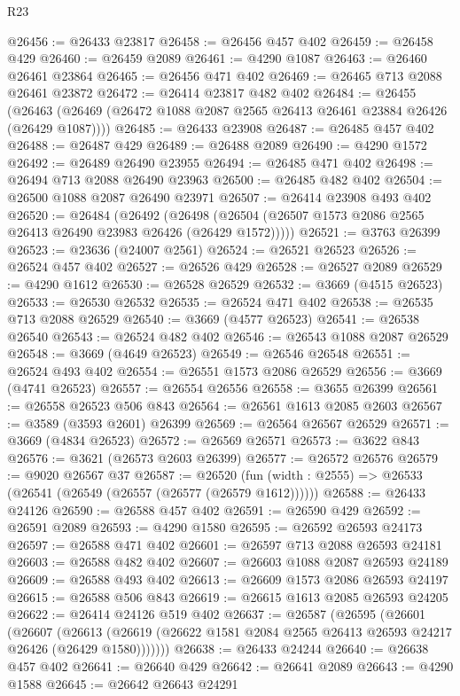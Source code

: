 \begin{lexlean}{R23}
\begin{coremodule}
@26456 := @26433 @23817
@26458 := @26456 @457 @402
@26459 := @26458 @429
@26460 := @26459 @2089
@26461 := @4290 @1087
@26463 := @26460 @26461 @23864
@26465 := @26456 @471 @402
@26469 := @26465 @713 @2088 @26461 @23872
@26472 := @26414 @23817 @482 @402
@26484 := @26455
    (@26463 (@26469 (@26472 @1088 @2087 @2565 @26413 @26461 @23884 @26426 (@26429 @1087))))
@26485 := @26433 @23908
@26487 := @26485 @457 @402
@26488 := @26487 @429
@26489 := @26488 @2089
@26490 := @4290 @1572
@26492 := @26489 @26490 @23955
@26494 := @26485 @471 @402
@26498 := @26494 @713 @2088 @26490 @23963
@26500 := @26485 @482 @402
@26504 := @26500 @1088 @2087 @26490 @23971
@26507 := @26414 @23908 @493 @402
@26520 := @26484
    (@26492 (@26498 (@26504 (@26507 @1573 @2086 @2565 @26413 @26490 @23983 @26426 (@26429 @1572)))))
@26521 := @3763 @26399
@26523 := @23636 (@24007 @2561)
@26524 := @26521 @26523
@26526 := @26524 @457 @402
@26527 := @26526 @429
@26528 := @26527 @2089
@26529 := @4290 @1612
@26530 := @26528 @26529
@26532 := @3669 (@4515 @26523)
@26533 := @26530 @26532
@26535 := @26524 @471 @402
@26538 := @26535 @713 @2088 @26529
@26540 := @3669 (@4577 @26523)
@26541 := @26538 @26540
@26543 := @26524 @482 @402
@26546 := @26543 @1088 @2087 @26529
@26548 := @3669 (@4649 @26523)
@26549 := @26546 @26548
@26551 := @26524 @493 @402
@26554 := @26551 @1573 @2086 @26529
@26556 := @3669 (@4741 @26523)
@26557 := @26554 @26556
@26558 := @3655 @26399
@26561 := @26558 @26523 @506 @843
@26564 := @26561 @1613 @2085 @2603
@26567 := @3589 (@3593 @2601) @26399
@26569 := @26564 @26567 @26529
@26571 := @3669 (@4834 @26523)
@26572 := @26569 @26571
@26573 := @3622 @843
@26576 := @3621 (@26573 @2603 @26399)
@26577 := @26572 @26576
@26579 := @9020 @26567 @37
@26587 := @26520 (fun (width : @2555) => @26533 (@26541 (@26549 (@26557 (@26577 (@26579 @1612))))))
@26588 := @26433 @24126
@26590 := @26588 @457 @402
@26591 := @26590 @429
@26592 := @26591 @2089
@26593 := @4290 @1580
@26595 := @26592 @26593 @24173
@26597 := @26588 @471 @402
@26601 := @26597 @713 @2088 @26593 @24181
@26603 := @26588 @482 @402
@26607 := @26603 @1088 @2087 @26593 @24189
@26609 := @26588 @493 @402
@26613 := @26609 @1573 @2086 @26593 @24197
@26615 := @26588 @506 @843
@26619 := @26615 @1613 @2085 @26593 @24205
@26622 := @26414 @24126 @519 @402
@26637 := @26587
    (@26595
      (@26601
        (@26607
          (@26613 (@26619 (@26622 @1581 @2084 @2565 @26413 @26593 @24217 @26426 (@26429 @1580)))))))
@26638 := @26433 @24244
@26640 := @26638 @457 @402
@26641 := @26640 @429
@26642 := @26641 @2089
@26643 := @4290 @1588
@26645 := @26642 @26643 @24291

\end{coremodule}
\end{lexlean}

